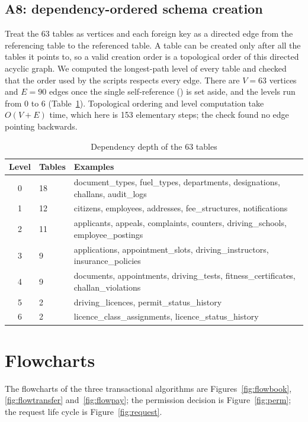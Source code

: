 \subsection{A8: dependency-ordered schema creation}
Treat the 63 tables as vertices and each foreign key as a directed edge from the
referencing table to the referenced table. A table can be created only after all the tables
it points to, so a valid creation order is a topological order of this directed acyclic
graph. We computed the longest-path level of every table and checked that the order used
by the scripts respects every edge. There are $V=63$ vertices and $E=90$ edges once the
single self-reference () is set aside, and the levels run from 0 to 6
(Table~\ref{tab:levels}). Topological ordering and level computation take $O(V+E)$ time,
which here is 153 elementary steps; the check found no edge pointing backwards.

\begin{table}[H]
\centering\small
\caption{Dependency depth of the 63 tables}\label{tab:levels}
\begin{tabularx}{\linewidth}{@{}cp{1.6cm}X@{}}
\toprule \textbf{Level} & \textbf{Tables} & \textbf{Examples}\\ \midrule
0 & 18 & document\_types, fuel\_types, departments, designations, challans, audit\_logs\\
1 & 12 & citizens, employees, addresses, fee\_structures, notifications\\
2 & 11 & applicants, appeals, complaints, counters, driving\_schools, employee\_postings\\
3 & 9 & applications, appointment\_slots, driving\_instructors, insurance\_policies\\
4 & 9 & documents, appointments, driving\_tests, fitness\_certificates, challan\_violations\\
5 & 2 & driving\_licences, permit\_status\_history\\
6 & 2 & licence\_class\_assignments, licence\_status\_history\\
\bottomrule
\end{tabularx}
\end{table}

\section{Flowcharts}
The flowcharts of the three transactional algorithms are Figures~\ref{fig:flowbook},
\ref{fig:flowtransfer} and~\ref{fig:flowpay}; the permission decision is
Figure~\ref{fig:perm}; the request life cycle is Figure~\ref{fig:request}.

